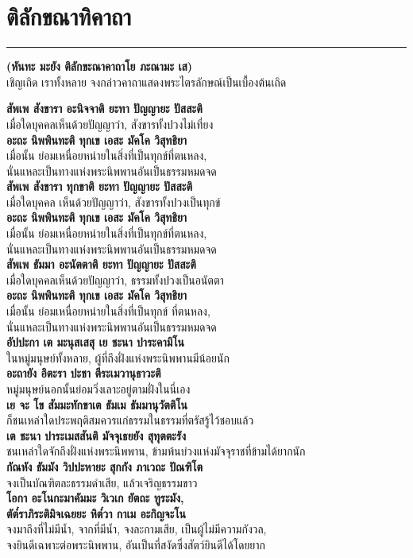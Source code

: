 \documentclass[12pt]{article}
\begin{document}
\section{ติลักขณาทิคาถา}
\hrule
\begin{center}
\textbf{(หันทะ มะยัง ติลักขะณาคาถาโย ภะณามะ เส)}\\
เชิญเถิด เราทั้งหลาย จงกล่าวคาถาแสดงพระไตรลักษณ์เป็นเบื้องต้นเถิด
\end{center}
\textbf{สัพเพ สังขารา อะนิจจาติ ยะทา ปัญญายะ ปัสสะติ}\\
\indent เมื่อใดบุคคลเห็นด้วยปัญญาว่า, สังขารทั้งปวงไม่เที่ยง\\
\textbf{อะถะ นิพพินทะติ ทุกเข เอสะ มัคโค วิสุทธิยา}\\
\indent เมื่อนั้น ย่อมเหนื่อยหน่ายในสิ่งที่เป็นทุกข์ที่ตนหลง,\\
\indent นั่นแหละเป็นทางแห่งพระนิพพานอันเป็นธรรมหมดจด\\
\textbf{สัพเพ สังขารา ทุกขาติ ยะทา ปัญญายะ ปัสสะติ}\\
\indent เมื่อใดบุคคล เห็นด้วยปัญญาว่า, สังขารทั้งปวงเป็นทุกข์\\
\textbf{อะถะ นิพพินทะติ ทุกเข เอสะ มัคโค วิสุทธิยา}\\
\indent เมื่อนั้น ย่อมเหนื่อยหน่ายในสิ่งที่เป็นทุกข์ที่ตนหลง,\\
\indent นั่นแหละเป็นทางแห่งพระนิพพานอันเป็นธรรมหมดจด\\
\textbf{สัพเพ ธัมมา อะนัตตาติ ยะทา ปัญญายะ ปัสสะติ}\\
\indent เมื่อใดบุคคลเห็นด้วยปัญญาว่า, ธรรมทั้งปวงเป็นอนัตตา\\
\textbf{อะถะ นิพพินทะติ ทุกเข เอสะ มัคโค วิสุทธิยา}\\
\indent เมื่อนั้น ย่อมเหนื่อยหน่ายในสิ่งที่เป็นทุกข์ ที่ตนหลง,\\
\indent นั่นแหละเป็นทางแห่งพระนิพพานอันเป็นธรรมหมดจด\\
\textbf{อัปปะกา เต มะนุสเสสุ เย ชะนา ปาระคามิโน}\\
\indent ในหมู่มนุษย์ทั้งหลาย, ผู้ที่ถึงฝั่งแห่งพระนิพพานมีน้อยนัก\\
\textbf{อะถายัง อิตะรา ปะชา ตีระเมวานุธาวะติ}\\
\indent หมู่มนุษย์นอกนั้นย่อมวิ่งเลาะอยู่ตามฝั่งในนี่เอง\\
\textbf{เย จะ โข สัมมะทักขาเต ธัมเม ธัมมานุวัตติโน}\\
\indent ก็ชนเหล่าใดประพฤติสมควรแก่ธรรมในธรรมที่ตรัสรู้ไว้ชอบแล้ว\\
\textbf{เต ชะนา ปาระเมสสันติ มัจจุเธยยัง สุทุตตะรัง}\\
\indent ชนเหล่าใดจักถึงฝั่งแห่งพระนิพพาน, ข้ามพ้นบ่วงแห่งมัจจุราชที่ข้ามได้ยากนัก\\
\textbf{กัณหัง ธัมมัง วิปปะหายะ สุกกัง ภาเวถะ ปัณฑิโต}\\
\indent จงเป็นบัณฑิตละธรรมดำเสีย, แล้วเจริญธรรมขาว\\
\textbf{โอกา อะโนกะมาคัมมะ วิเวเก ยัตถะ ทูระมัง,\\
ตัต๎ราภิระติมิจเฉยยะ หิต๎วา กาเม อะกิญจะโน}\\
\indent จงมาถึงที่ไม่มีน้ำ, จากที่มีน้ำ, จงละกามเสีย, เป็นผู้ไม่มีความกังวล,\\
\indent จงยินดีเฉพาะต่อพระนิพพาน, อันเป็นที่สงัดซึ่งสัตว์ยินดีได้โดยยาก\\
\end{document}
